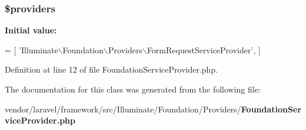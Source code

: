 \subsubsection[{\$providers}]{\setlength{\rightskip}{0pt plus 5cm}\$providers\hspace{0.3cm}{\ttfamily [protected]}}\label{class_illuminate_1_1_foundation_1_1_providers_1_1_foundation_service_provider_a8619fb6079fbd79202034b45724fd6ca}
{\bfseries Initial value\+:}
\begin{DoxyCode}
= [
        \textcolor{stringliteral}{'Illuminate\(\backslash\)Foundation\(\backslash\)Providers\(\backslash\)FormRequestServiceProvider'},
    ]
\end{DoxyCode}


Definition at line 12 of file Foundation\+Service\+Provider.\+php.



The documentation for this class was generated from the following file\+:\begin{DoxyCompactItemize}
\item 
vendor/laravel/framework/src/\+Illuminate/\+Foundation/\+Providers/{\bf Foundation\+Service\+Provider.\+php}\end{DoxyCompactItemize}
